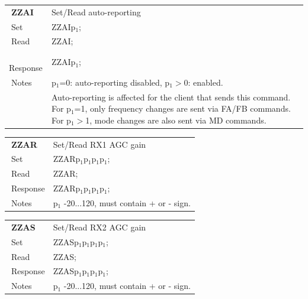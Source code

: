 \documentclass[12pt]{book}
\begin{document}
\begin{center}
\begin{tabular}{|p{2cm}|p{11cm}|}
\toprule
$\phantom{\Big|}$\textbf{\large ZZAI} & Set/Read auto-reporting \\\cline{1-2}
$\phantom{\Big|}${\large Set} & {ZZAIp$_1$;} \\\hline
$\phantom{\Big|}${\large Read} & {ZZAI;} \\\hline
$\phantom{\Big|}${\large Response} & {ZZAIp$_1$;} \\\hline
$\phantom{\Big|}${\large Notes} & \multicolumn{1}{|p{11cm}|}{p$_1$=0: auto-reporting disabled, p$_1$$>$0: enabled.} \\
 & \multicolumn{1}{|p{11cm}|}{Auto-reporting is affected for the client that sends this command. For p$_1$=1, only frequency changes are sent via FA/FB commands. For p$_1$$>$1, mode changes are also sent via MD commands.} \\
\bottomrule
\end{tabular}
\end{center}

\begin{center}
\begin{tabular}{|p{2cm}|p{11cm}|}
\toprule
$\phantom{\Big|}$\textbf{\large ZZAR} & Set/Read RX1 AGC gain \\\cline{1-2}
$\phantom{\Big|}${\large Set} & {ZZARp$_1$p$_1$p$_1$p$_1$;} \\\hline
$\phantom{\Big|}${\large Read} & {ZZAR;} \\\hline
$\phantom{\Big|}${\large Response} & {ZZARp$_1$p$_1$p$_1$p$_1$;} \\\hline
$\phantom{\Big|}${\large Notes} & \multicolumn{1}{|p{11cm}|}{p$_1$ -20...120, must contain + or - sign.} \\
\bottomrule
\end{tabular}
\end{center}

\begin{center}
\begin{tabular}{|p{2cm}|p{11cm}|}
\toprule
$\phantom{\Big|}$\textbf{\large ZZAS} & Set/Read RX2 AGC gain \\\cline{1-2}
$\phantom{\Big|}${\large Set} & {ZZASp$_1$p$_1$p$_1$p$_1$;} \\\hline
$\phantom{\Big|}${\large Read} & {ZZAS;} \\\hline
$\phantom{\Big|}${\large Response} & {ZZASp$_1$p$_1$p$_1$p$_1$;} \\\hline
$\phantom{\Big|}${\large Notes} & \multicolumn{1}{|p{11cm}|}{p$_1$ -20...120, must contain + or - sign.} \\
\bottomrule
\end{tabular}
\end{center}
\end{document}
